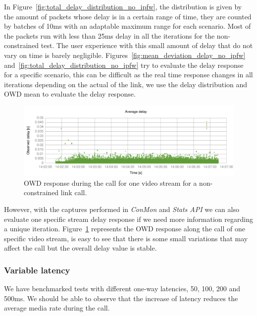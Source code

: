 In Figure~\ref{fig:total_delay_distribution_no_ipfw}, the distribution is given by the amount of packets whose delay is in a certain range of time, they are counted by batches of 10ms with an adaptable maximum range for each scenario. Most of the packets run with less than 25ms delay in all the iterations for the non-constrained test. The user experience with this small amount of delay that do not vary on time is barely negligible. Figures~\ref{fig:mean_deviation_delay_no_ipfw} and~\ref{fig:total_delay_distribution_no_ipfw} try to evaluate the delay response for a specific scenario, this can be difficult as the real time response changes in all iterations depending on the actual of the link, we use the delay distribution and OWD mean to evaluate the delay response.

 \begin{figure}[h]
  \centering
    \includegraphics[width=1\textwidth]{./figures/delay_2_116_111e8a13-delay_old.pdf}
      \caption[OWD response during the call for one video stream for a non-constrained link call]{OWD response during the call for one video stream for a non-constrained link call.}
	\label{fig:delay_stream_no_constraints}
\end{figure}

However, with the captures performed in {\it ConMon} and {\it Stats API} we can also evaluate one specific stream delay response if we need more information regarding a unique iteration. Figure~\ref{fig:delay_stream_no_constraints} represents the OWD response along the call of one specific video stream, is easy to see that there is some small variations that may affect the call but the overall delay value is stable.

\subsubsection{Variable latency}

We have benchmarked tests with different one-way latencies, 50, 100, 200 and 500ms. We should be able to observe that the increase of latency reduces the average media rate during the call.

